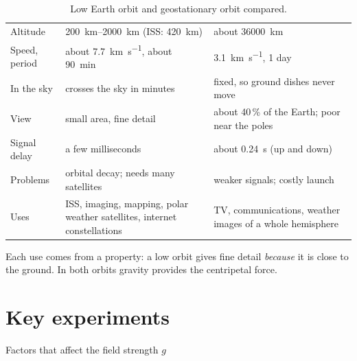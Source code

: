 \begin{table}
  \caption{Low Earth orbit and geostationary orbit compared.}\label{ch4:tab:leogeo}
  \centering
  \small
  \begin{tabular}{@{}L{25mm}L{57mm}L{58mm}@{}}
    \toprule
     &  & \\
    \midrule
    Altitude & \qtyrange{200}{2000}{km} (ISS: \qty{420}{km}) & about \qty{36000}{km}\\
    Speed, period & about \qty{7.7}{km.s^{-1}}, about \qty{90}{min} & \qty{3.1}{km.s^{-1}}, 1 day\\
    In the sky & crosses the sky in minutes & fixed, so ground dishes never move\\
    View & small area, fine detail & about 40\,\% of the Earth; poor near the poles\\
    Signal delay & a few milliseconds & about \qty{0.24}{s} (up and down)\\
    Problems & orbital decay; needs many satellites & weaker signals; costly launch\\
    Uses & ISS, imaging, mapping, polar weather satellites, internet constellations
      & TV, communications, weather images of a whole hemisphere\\
    \bottomrule
  \end{tabular}
\end{table}

Each use comes from a property: a low orbit gives fine detail \emph{because} it is close to the
ground. In both orbits gravity provides the centripetal force.

\clearpage
\section{Key experiments}\label{ch4:sec:experiments}

\begin{experiment}{Factors that affect the field strength \texorpdfstring{$g$}{g}}
\end{experiment}

